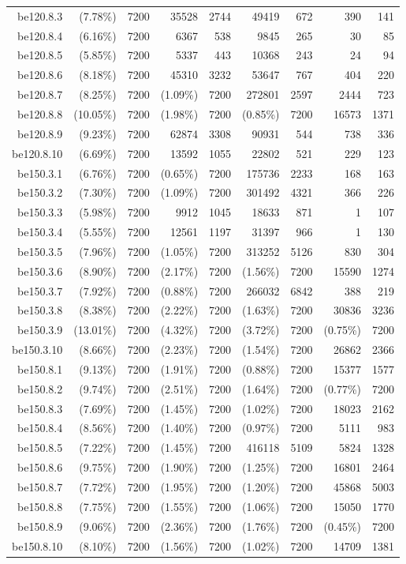 \documentclass[pdflatex,sn-mathphys-num]{sn-jnl}%
\theoremstyle{thmstyleone}%
\theoremstyle{thmstyletwo}%
\theoremstyle{thmstylethree}%
\begin{document}
\begin{table}[h!]
\begin{tabular}{rrrrrrrrr}
		be120.8.3 &(7.78\%) &7200 &35528 &2744 &49419 &672 &390 &141  \\
		be120.8.4 &(6.16\%) &7200 &6367 &538 &9845 &265 &30 &85  \\
		be120.8.5 &(5.85\%) &7200 &5337 &443 &10368 &243 &24 &94  \\
		be120.8.6 &(8.18\%) &7200 &45310 &3232 &53647 &767 &404 &220  \\
		be120.8.7 &(8.25\%) &7200 &(1.09\%) &7200 &272801 &2597 &2444 &723  \\
		be120.8.8 &(10.05\%) &7200 &(1.98\%) &7200 &(0.85\%) &7200 &16573 &1371  \\
		be120.8.9 &(9.23\%) &7200 &62874 &3308 &90931 &544 &738 &336  \\
		be120.8.10 &(6.69\%) &7200 &13592 &1055 &22802 &521 &229 &123  \\
		be150.3.1 &(6.76\%) &7200 &(0.65\%) &7200 &175736 &2233 &168 &163  \\
		be150.3.2 &(7.30\%) &7200 &(1.09\%) &7200 &301492 &4321 &366 &226  \\
		be150.3.3 &(5.98\%) &7200 &9912 &1045 &18633 &871 &1 &107  \\
		be150.3.4 &(5.55\%) &7200 &12561 &1197 &31397 &966 &1 &130  \\
		be150.3.5 &(7.96\%) &7200 &(1.05\%) &7200 &313252 &5126 &830 &304  \\
		be150.3.6 &(8.90\%) &7200 &(2.17\%) &7200 &(1.56\%) &7200 &15590 &1274  \\
		be150.3.7 &(7.92\%) &7200 &(0.88\%) &7200 &266032 &6842 &388 &219  \\
		be150.3.8 &(8.38\%) &7200 &(2.22\%) &7200 &(1.63\%) &7200 &30836 &3236  \\
		be150.3.9 &(13.01\%) &7200 &(4.32\%) &7200 &(3.72\%) &7200 &(0.75\%) &7200  \\
		be150.3.10 &(8.66\%) &7200 &(2.23\%) &7200 &(1.54\%) &7200 &26862 &2366  \\
		be150.8.1 &(9.13\%) &7200 &(1.91\%) &7200 &(0.88\%) &7200 &15377 &1577  \\
		be150.8.2 &(9.74\%) &7200 &(2.51\%) &7200 &(1.64\%) &7200 &(0.77\%) &7200  \\
		be150.8.3 &(7.69\%) &7200 &(1.45\%) &7200 &(1.02\%) &7200 &18023 &2162  \\
		be150.8.4 &(8.56\%) &7200 &(1.40\%) &7200 &(0.97\%) &7200 &5111 &983  \\
		be150.8.5 &(7.22\%) &7200 &(1.45\%) &7200 &416118 &5109 &5824 &1328  \\
		be150.8.6 &(9.75\%) &7200 &(1.90\%) &7200 &(1.25\%) &7200 &16801 &2464  \\
		be150.8.7 &(7.72\%) &7200 &(1.95\%) &7200 &(1.20\%) &7200 &45868 &5003  \\
		be150.8.8 &(7.75\%) &7200 &(1.55\%) &7200 &(1.06\%) &7200 &15050 &1770  \\
		be150.8.9 &(9.06\%) &7200 &(2.36\%) &7200 &(1.76\%) &7200 &(0.45\%) &7200  \\
		be150.8.10 &(8.10\%) &7200 &(1.56\%) &7200 &(1.02\%) &7200 &14709 &1381  \\
		\bottomrule
	\end{tabular}
\end{table}		
\end{document}
